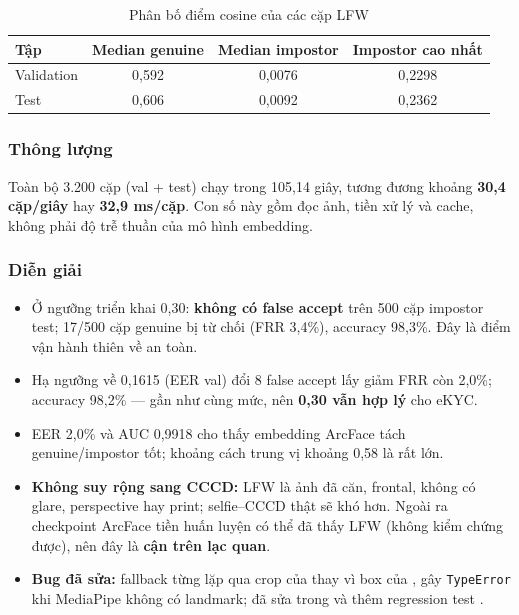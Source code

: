 \documentclass[12pt,a4paper]{article}
\begin{document}
\begin{table}[H]
  \centering
  \caption{Phân bố điểm cosine của các cặp LFW}
  \label{tab:lfw-score-dist}
  \small
  \begin{tabular}{@{}lccc@{}}
    \toprule
    \textbf{Tập} & \textbf{Median genuine} & \textbf{Median impostor} & \textbf{Impostor cao nhất}\\
    \midrule
    Validation & 0,592 & 0,0076 & 0,2298\\
    Test & 0,606 & 0,0092 & 0,2362\\
    \bottomrule
  \end{tabular}
\end{table}

\subsubsection{Thông lượng}
Toàn bộ 3.200 cặp (val + test) chạy trong 105,14 giây, tương đương khoảng \textbf{30,4 cặp/giây}
hay \textbf{32,9 ms/cặp}. Con số này gồm đọc ảnh, tiền xử lý và cache, không phải độ trễ thuần của
mô hình embedding.

\subsubsection{Diễn giải}
\begin{itemize}
  \item Ở ngưỡng triển khai 0,30: \textbf{không có false accept} trên 500 cặp impostor test;
        17/500 cặp genuine bị từ chối (FRR 3,4\%), accuracy 98,3\%. Đây là điểm vận hành thiên về an toàn.
  \item Hạ ngưỡng về 0,1615 (EER val) đổi 8 false accept lấy giảm FRR còn 2,0\%; accuracy 98,2\% ---
        gần như cùng mức, nên \textbf{0,30 vẫn hợp lý} cho eKYC.
  \item EER 2,0\% và AUC 0,9918 cho thấy embedding ArcFace tách genuine/impostor tốt; khoảng cách
        trung vị khoảng 0,58 là rất lớn.
  \item \textbf{Không suy rộng sang CCCD:} LFW là ảnh đã căn, frontal, không có glare, perspective
        hay print; selfie--CCCD thật sẽ khó hơn. Ngoài ra checkpoint ArcFace tiền huấn luyện có thể
        đã thấy LFW (không kiểm chứng được), nên đây là \textbf{cận trên lạc quan}.
  \item \textbf{Bug đã sửa:} fallback  từng lặp qua crop của
         thay vì box của , gây \texttt{TypeError}
        khi MediaPipe không có landmark; đã sửa trong  và thêm regression test
        .
\end{itemize}
\end{document}
